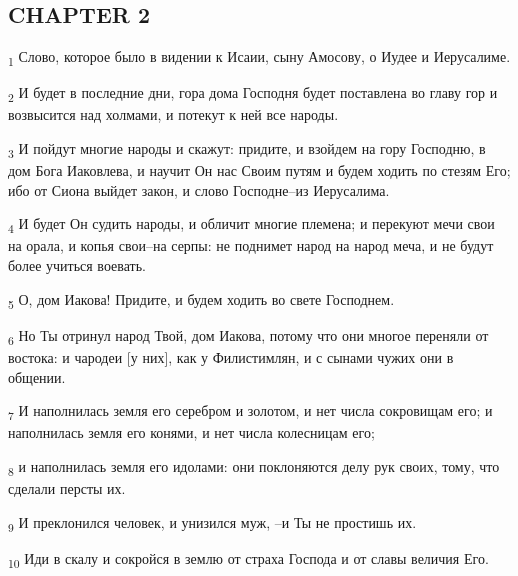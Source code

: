 \subsection{CHAPTER 2}
\begin{tcolorbox}
\textsubscript{1} Слово, которое было в видении к Исаии, сыну Амосову, о Иудее и Иерусалиме.
\end{tcolorbox}
\begin{tcolorbox}
\textsubscript{2} И будет в последние дни, гора дома Господня будет поставлена во главу гор и возвысится над холмами, и потекут к ней все народы.
\end{tcolorbox}
\begin{tcolorbox}
\textsubscript{3} И пойдут многие народы и скажут: придите, и взойдем на гору Господню, в дом Бога Иаковлева, и научит Он нас Своим путям и будем ходить по стезям Его; ибо от Сиона выйдет закон, и слово Господне--из Иерусалима.
\end{tcolorbox}
\begin{tcolorbox}
\textsubscript{4} И будет Он судить народы, и обличит многие племена; и перекуют мечи свои на орала, и копья свои--на серпы: не поднимет народ на народ меча, и не будут более учиться воевать.
\end{tcolorbox}
\begin{tcolorbox}
\textsubscript{5} О, дом Иакова! Придите, и будем ходить во свете Господнем.
\end{tcolorbox}
\begin{tcolorbox}
\textsubscript{6} Но Ты отринул народ Твой, дом Иакова, потому что они многое переняли от востока: и чародеи [у них], как у Филистимлян, и с сынами чужих они в общении.
\end{tcolorbox}
\begin{tcolorbox}
\textsubscript{7} И наполнилась земля его серебром и золотом, и нет числа сокровищам его; и наполнилась земля его конями, и нет числа колесницам его;
\end{tcolorbox}
\begin{tcolorbox}
\textsubscript{8} и наполнилась земля его идолами: они поклоняются делу рук своих, тому, что сделали персты их.
\end{tcolorbox}
\begin{tcolorbox}
\textsubscript{9} И преклонился человек, и унизился муж, --и Ты не простишь их.
\end{tcolorbox}
\begin{tcolorbox}
\textsubscript{10} Иди в скалу и сокройся в землю от страха Господа и от славы величия Его.
\end{tcolorbox}
